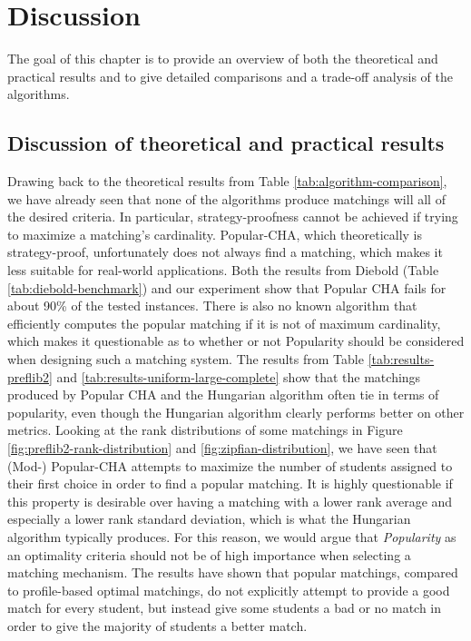 \section{Discussion}

The goal of this chapter is to provide an overview of both the theoretical and practical results and to give detailed comparisons and a trade-off analysis of the algorithms.

\subsection{Discussion of theoretical and practical results}
Drawing back to the theoretical results from Table \ref{tab:algorithm-comparison}, we have already seen that none of the algorithms produce matchings will all of the desired criteria. In particular, strategy-proofness cannot be achieved if trying to maximize a matching's cardinality. Popular-CHA, which theoretically is strategy-proof, unfortunately does not always find a matching, which makes it less suitable for real-world applications. Both the results from Diebold (Table \ref{tab:diebold-benchmark}) and our experiment show that Popular CHA fails for about 90\% of the tested instances. There is also no known algorithm that efficiently computes the popular matching if it is not of maximum cardinality, which makes it questionable as to whether or not Popularity should be considered when designing such a matching system. The results from Table \ref{tab:results-preflib2} and \ref{tab:results-uniform-large-complete} show that the matchings produced by Popular CHA and the Hungarian algorithm often tie in terms of popularity, even though the Hungarian algorithm clearly performs better on other metrics. Looking at the rank distributions of some matchings in Figure \ref{fig:preflib2-rank-distribution} and \ref{fig:zipfian-distribution}, we have seen that (Mod-) Popular-CHA attempts to maximize the number of students assigned to their first choice in order to find a popular matching. It is highly questionable if this property is desirable over having a matching with a lower rank average and especially a lower rank standard deviation, which is what the Hungarian algorithm typically produces. For this reason, we would argue that \emph{Popularity} as an optimality criteria should not be of high importance when selecting a matching mechanism. The results have shown that popular matchings, compared to profile-based optimal matchings, do not explicitly attempt to provide a good match for every student, but instead give some students a bad or no match in order to give the majority of students a better match.

